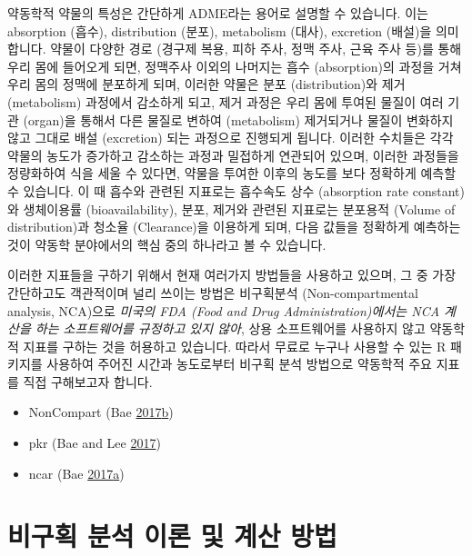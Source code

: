 \documentclass[12pt,]{krantz}
\providecommand{\tightlist}{%
  \setlength{\itemsep}{0pt}\setlength{\parskip}{0pt}}
\theoremstyle{definition}
\theoremstyle{definition}
\theoremstyle{definition}
\theoremstyle{remark}
\begin{document}
약동학적 약물의 특성은 간단하게 ADME라는 용어로 설명할 수 있습니다. 이는
absorption (흡수), distribution (분포), metabolism (대사), excretion
(배설)을 의미합니다. 약물이 다양한 경로 (경구제 복용, 피하 주사, 정맥
주사, 근육 주사 등)를 통해 우리 몸에 들어오게 되면, 정맥주사 이외의
나머지는 흡수 (absorption)의 과정을 거쳐 우리 몸의 정맥에 분포하게 되며,
이러한 약물은 분포 (distribution)와 제거 (metabolism) 과정에서 감소하게
되고, 제거 과정은 우리 몸에 투여된 물질이 여러 기관 (organ)을 통해서
다른 물질로 변하여 (metabolism) 제거되거나 물질이 변화하지 않고 그대로
배설 (excretion) 되는 과정으로 진행되게 됩니다. 이러한 수치들은 각각
약물의 농도가 증가하고 감소하는 과정과 밀접하게 연관되어 있으며, 이러한
과정들을 정량화하여 식을 세울 수 있다면, 약물을 투여한 이후의 농도를
보다 정확하게 예측할 수 있습니다. 이 때 흡수와 관련된 지표로는 흡수속도
상수 (absorption rate constant)와 생체이용률 (bioavailability), 분포,
제거와 관련된 지표로는 분포용적 (Volume of distribution)과 청소율
(Clearance)을 이용하게 되며, 다음 값들을 정확하게 예측하는 것이 약동학
분야에서의 핵심 중의 하나라고 볼 수 있습니다.

이러한 지표들을 구하기 위해서 현재 여러가지 방법들을 사용하고 있으며, 그
중 가장 간단하고도 객관적이며 널리 쓰이는 방법은 비구획분석
(Non-compartmental analysis, NCA)으로 \emph{미국의 FDA (Food and Drug
Administration)에서는 NCA 계산을 하는 소프트웨어를 규정하고 있지 않아},
상용 소프트웨어를 사용하지 않고 약동학적 지표를 구하는 것을 허용하고
있습니다. 따라서 무료로 누구나 사용할 수 있는 R 패키지를 사용하여 주어진
시간과 농도로부터 비구획 분석 방법으로 약동학적 주요 지표를 직접
구해보고자 합니다.

\begin{itemize}
\tightlist
\item
  NonCompart (Bae
  \protect\hyperlink{ref-R-NonCompart}{2017}\protect\hyperlink{ref-R-NonCompart}{b})
\item
  pkr (Bae and Lee \protect\hyperlink{ref-R-pkr}{2017})
\item
  ncar (Bae
  \protect\hyperlink{ref-R-ncar}{2017}\protect\hyperlink{ref-R-ncar}{a})
\end{itemize}

\section{비구획 분석 이론 및 계산 방법}\label{ncar-method}
\end{document}
